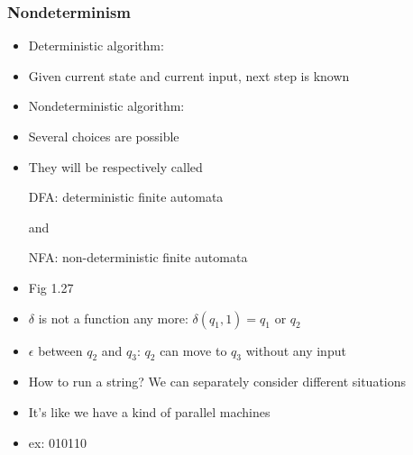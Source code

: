 




\begin{frame}[allowframebreaks] \frametitle{Nondeterminism}
  \begin{itemize}
\item Deterministic algorithm:

\item [] Given current state and current input, next step is known
\item Nondeterministic algorithm:

\item [] Several choices are possible
  
\item They will be respectively called
  \begin{center}
  DFA: deterministic finite automata
\end{center}
  and
  \begin{center}
  NFA: non-deterministic finite automata
\end{center}
\item Fig 1.27

\begin{center}
    \end{center}
  
  \item $\delta$ is not a function any more: $\delta(q_1, 1) = q_1
$ or $q_2$

\item $\epsilon$ between $q_2$ and $q_3$: $q_2$ can move to
$q_3$ without any input
\item How to run a string? We can separately consider different
  situations

\item It's like we have a kind of parallel machines
\item ex: 010110


\end{itemize}
\end{frame}
